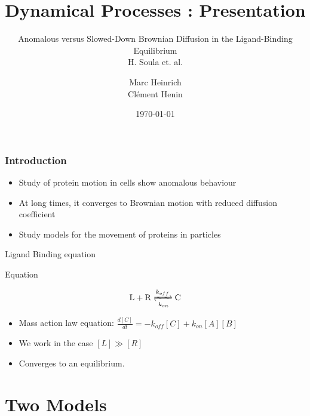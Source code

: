 \documentclass{beamer}
\title{Dynamical Processes : Presentation}
\subtitle{Anomalous versus Slowed-Down Brownian Diffusion
in the Ligand-Binding Equilibrium \\ H. Soula et. al.}
\author{Marc Heinrich \\ Clément Henin}
\date\today
\begin{document}
\begin{frame}
\maketitle
\end{frame}

\begin{frame}
\frametitle{Introduction}
	
\begin{itemize}
\itemsep2em
\item Study of protein motion in cells show anomalous behaviour
\item At long times, it converges to Brownian motion with reduced diffusion coefficient
\item Study models for the movement of proteins in particles
\end{itemize}
\end{frame}

\begin{frame}{Ligand Binding equation}
\begin{block}{Equation}

\begin{align*}
\mathrm{L+R} \xrightleftharpoons[k_{on}]{k_{off}} \mathrm{C}
\end{align*}
\end{block}

\begin{itemize}
\itemsep1em
\item Mass action law equation: $\frac{d[C]}{dt} = - k_{off}[C] + k_{on}[A][B] $ 
\item We work in the case $[L] \gg [R]$
\item Converges to an equilibrium.
\end{itemize}



\end{frame}

\section{Two Models}
\end{document}
